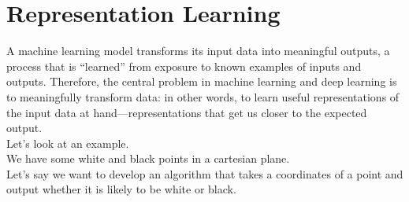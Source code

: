 \documentclass{SBCbookchapter}
\begin{document}
\section*{Representation Learning}
A machine learning model transforms its input data
into meaningful outputs, a process that is “learned” 
from exposure to known examples of inputs and outputs. 
Therefore,  the  central  problem  in  machine  learning
and  deep  learning  is  to meaningfully transform  data:
in  other  words,  to  learn  useful representations
of  the  input  data  at hand—representations that 
get us closer to the expected output. \\
Let's look at an example. \\
We have some white and black points in a cartesian plane. \\
Let's say we want to develop an algorithm that takes a coordinates
of a point and output whether it is likely to be white or black. \\
\end{document}
